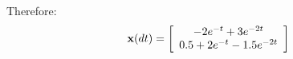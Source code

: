 Therefore:
\[
{\bf{x}}(dt) = \left[ {\begin{array}{*{20}c}
   { - 2e^{ - t}  + 3e^{ - 2t} }  \\
   {0.5 + 2e^{ - t}  - 1.5e^{ - 2t} }  \\
\end{array}} \right]
\]


 

